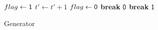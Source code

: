 

\begin{wrapfigure}[21]{L}{0.51\textwidth}
\vspace{-1.5em}
\begin{framed}
    \renewcommand\figurename{Algorithm}
    \caption{Generator}
    \label{alg:coloring}
    \begin{algorithmic}[1]
                    \State {}
                \EndIf
                        \State $flag\gets \mathsf{1}$
                            \State $t'\gets t' + 1$
                                \State $flag\gets \mathsf{0}$
                                \State \textbf{break}
                            \EndIf
                        \EndWhile
                            \State \Return $\mathsf{0}$
                        \EndIf
                        \State \textbf{break}
                   \EndIf
                \EndFor
            \EndFor
            \State \Return $\mathsf{1}$
        \EndProcedure
    \end{algorithmic}
\end{framed}
\end{wrapfigure}

